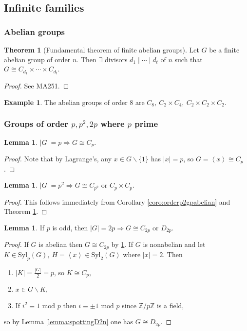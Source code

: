 \documentclass[a4paper]{article}
\newcommand{\la}{\left\langle}
\newcommand{\ra}{\right\rangle}
\newcommand{\Z}{\mathbb{Z}}
\newcommand{\Syl}{\text{Syl}}
\newcommand{\Mod}{\text{ mod }}
\theoremstyle{definition}
\newtheorem{thm}[defn]{Theorem}
\newtheorem{lemma}[defn]{Lemma}
\newtheorem{example}[defn]{Example}
\begin{document}
\subsection{Infinite families}
\subsubsection{Abelian groups}
\begin{thm}[Fundamental theorem of finite abelian groups]
\label{thm:FTFAG}
Let $G$ be a finite abelian group of order $n$. Then $\exists$ divisors $d_1\mid \cdots \mid d_t$ of $n$ such that $G\cong C_{d_1}\times\cdots\times C_{d_t}$.
\end{thm}
\begin{proof}
See MA251.
\end{proof}

\begin{example}
The abelian groups of order 8 are $C_8,\ C_2\times C_4,\ C_2\times C_2\times C_2$.
\end{example}

\subsubsection{Groups of order $p,p^2,2p$ where $p$ prime}
\begin{lemma}
$|G|=p\Rightarrow G\cong C_p$.
\end{lemma}
\begin{proof}
Note that by Lagrange's, any $x\in G\backslash \{1\}$ has $|x|=p$, so $G=\la x\ra\cong C_p$.
\end{proof}

\begin{lemma}
$|G|=p^2\Rightarrow G\cong C_{p^2}$ or $C_p\times C_p$.
\end{lemma}
\begin{proof}
This follows immediately from Corollary \ref{coro:orderp2gpabelian} and Theorem \ref{thm:FTFAG}.
\end{proof}

\begin{lemma}
If $p$ is odd, then $|G|=2p\Rightarrow G\cong C_{2p}$ or $D_{2p}$.
\end{lemma}
\begin{proof}
If $G$ is abelian then $G\cong C_{2p}$ by \ref{thm:FTFAG}. If $G$ is nonabelian and let $K\in\Syl_p(G),\ H=\la x\ra \in\Syl_2(G)$ where $|x|=2$. Then
\begin{enumerate}
\item $|K|=\frac{|G|}{2}=p$, so $K\cong C_p$,
\item $x\in G\backslash K$,
\item If $i^2\equiv 1\Mod p$ then $i\equiv \pm 1\Mod p$ since $\Z/p\Z$ is a field,
\end{enumerate}
so by Lemma \ref{lemma:spottingD2n} one has $G\cong D_{2p}$.
\end{proof}
\end{document}

